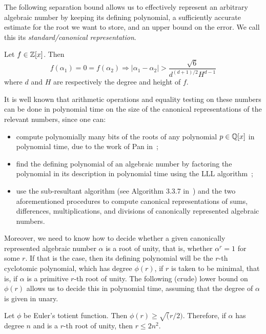 The following separation bound allows us to effectively represent an arbitrary algebraic number by keeping its defining polynomial, a sufficiently accurate estimate for the root we want to store, and an upper bound on the error. We call this its \emph{standard/canonical representation}.

\begin{lemma}[Mignotte]
Let $f\in\mathbb{Z}[x]$. Then
\begin{equation}
f(\alpha_1)=0=f(\alpha_2)\Rightarrow \lvert \alpha_1-\alpha_2\rvert>\frac{\sqrt{6}}{d^{(d+1)/2}H^{d-1}}
\end{equation}
where $d$ and $H$ are respectively the degree and height of $f$.
\end{lemma}

It is well known that arithmetic operations and equality testing on these numbers can be done in polynomial time on the size of the canonical representations of the relevant numbers, since one can:
\begin{itemize}
\item compute polynomially many bits of the roots of any polynomial $p\in\mathbb{Q}[x]$ in polynomial time, due to the work of Pan in~\cite{Pan97};
\item find the defining polynomial of an algebraic number by factoring the polynomial in its description in polynomial time using the LLL algorithm~\cite{LenstraLenstraLovasz1982};
\item use the sub-resultant algorithm (see Algorithm 3.3.7 in~\cite{Coh93}) and the two aforementioned procedures to compute canonical representations of sums, differences, multiplications, and divisions of canonically represented algebraic numbers.
\end{itemize}

Moreover, we need to know how to decide whether a given canonically represented algebraic number $\alpha$ is a root of unity, that is, whether $\alpha^r=1$ for some $r$. If that is the case, then its defining polynomial will be the $r$-th cyclotomic polynomial, which has degree $\phi(r)$, if $r$ is taken to be minimal, that is, if $\alpha$ is a primitive $r$-th root of unity. The following (crude) lower bound on $\phi(r)$ allows us to decide this in polynomial time, assuming that the degree of $\alpha$ is given in unary.

\begin{lemma}
Let $\phi$ be Euler's totient function. Then $\phi(r)\geq\sqrt(r/2)$. Therefore, if $\alpha$ has degree $n$ and is a $r$-th root of unity, then $r\leq 2n^2$.
\end{lemma}

